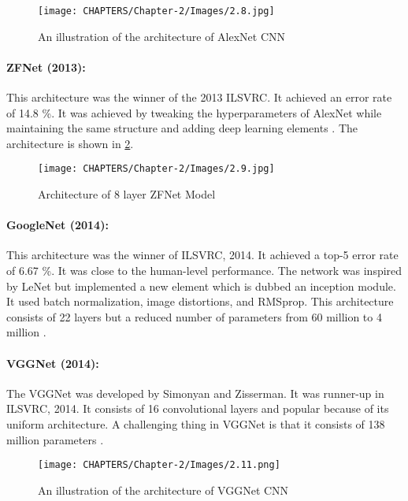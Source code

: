  
\begin{figure}[H]
    \centering
    \captionsetup{justification=centering,margin=2cm}
    \texttt{[image: CHAPTERS/Chapter-2/Images/2.8.jpg]}
    \caption{An illustration of the architecture of AlexNet CNN}
    \label{fig:2.8}
\end{figure}

\paragraph*{ZFNet (2013):}
This architecture was the winner of the 2013 ILSVRC. It achieved an error rate of 14.8 \%. It was achieved by tweaking the hyperparameters of AlexNet while maintaining the same structure and adding deep learning elements \cite{chap_2_article:11}. The architecture 
is shown in \ref{fig:2.9}.

\begin{figure}[H]
    \centering
    \captionsetup{justification=centering,margin=2cm}
    \texttt{[image: CHAPTERS/Chapter-2/Images/2.9.jpg]}
    \caption{Architecture of 8 layer ZFNet Model}
    \label{fig:2.9}
\end{figure}

\paragraph*{GoogleNet (2014):}
This architecture was the winner of  ILSVRC, 2014. It achieved a top-5 
error rate of 6.67 \%. It was close to the human-level performance. The network was inspired by LeNet but implemented a new element which is dubbed an inception module. It used batch normalization, image distortions, and RMSprop. This architecture consists of 22 layers but a 
reduced number of parameters from 60 million to 4 million \cite{chap_2_article:12}. 

\paragraph*{VGGNet (2014):}
The VGGNet was developed by Simonyan and Zisserman. It was 
runner-up in ILSVRC, 2014. It consists of 16 convolutional 
layers and popular because of its uniform architecture. A challenging thing in 
VGGNet is that it consists of 138 million parameters \cite{chap_2_article:13}.
\begin{figure}[H]
    \centering
    \captionsetup{justification=centering,margin=2cm}
    \texttt{[image: CHAPTERS/Chapter-2/Images/2.11.png]}
    \caption{An illustration of the architecture of VGGNet CNN}
    \label{fig:2.10}
\end{figure}

